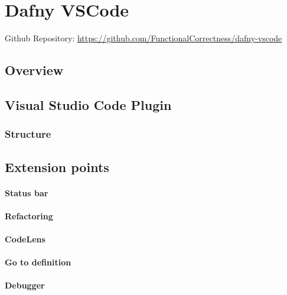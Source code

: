 \section{Dafny VSCode}
Github Repository: \href{https://github.com/FunctionalCorrectness/dafny-vscode}{https://github.com/FunctionalCorrectness/dafny-vscode}

\subsection{Overview}

\subsection{Visual Studio Code Plugin}
\subsubsection{Structure}




\subsection{Extension points}

\paragraph{Status bar}

\paragraph{Refactoring}

\paragraph{CodeLens}

\paragraph{Go to definition}

\paragraph{Debugger}

